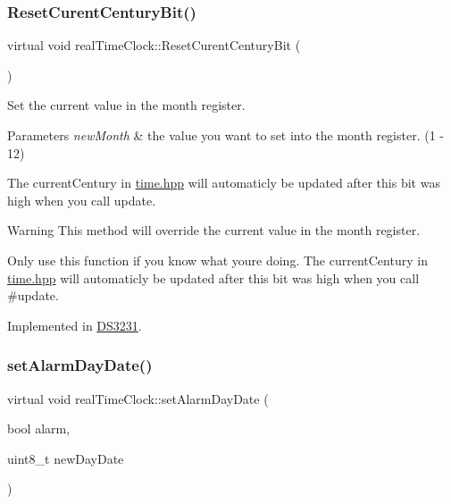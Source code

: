 \subsubsection{\texorpdfstring{Reset\+Curent\+Century\+Bit()}{ResetCurentCenturyBit()}}
{\footnotesize\ttfamily virtual void real\+Time\+Clock\+::\+Reset\+Curent\+Century\+Bit (\begin{DoxyParamCaption}{ }\end{DoxyParamCaption})\hspace{0.3cm}{\ttfamily [pure virtual]}}



Set the current value in the month register. 


\begin{DoxyParams}{Parameters}
{\em new\+Month} & the value you want to set into the month register. (1 -\/ 12)\\
\hline
\end{DoxyParams}
The current\+Century in \mbox{\hyperlink{time_8hpp_source}{time.\+hpp}} will automaticly be updated after this bit was high when you call update. \begin{DoxyWarning}{Warning}
This method will override the current value in the month register. 

Only use this function if you know what you\textquotesingle{}re doing. The current\+Century in \mbox{\hyperlink{time_8hpp_source}{time.\+hpp}} will automaticly be updated after this bit was high when you call \#update. 
\end{DoxyWarning}


Implemented in \mbox{\hyperlink{class_d_s3231_a6477bd1bb91d3df6a088c369692f46a3}{D\+S3231}}.

\mbox{\label{classreal_time_clock_a2c2bb16a7fc59f463fb3aaed2fcd1926}} 
\subsubsection{\texorpdfstring{set\+Alarm\+Day\+Date()}{setAlarmDayDate()}}
{\footnotesize\ttfamily virtual void real\+Time\+Clock\+::set\+Alarm\+Day\+Date (\begin{DoxyParamCaption}\item[{bool}]{alarm,  }\item[{uint8\+\_\+t}]{new\+Day\+Date }\end{DoxyParamCaption})\hspace{0.3cm}{\ttfamily [pure virtual]}}



